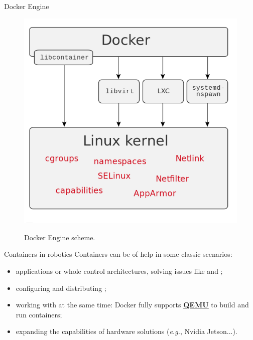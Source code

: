 \begin{frame}{Docker Engine}
	\begin{figure}
		\centering
		\includegraphics[scale=.29]{dockerScheme.png}
		\label{fig:dockerscheme}
		\caption{Docker Engine scheme.}
	\end{figure}
\end{frame}

\begin{frame}{Containers in robotics}
	Containers can be of help in some classic scenarios:
	\begin{itemize}
		\item {} applications or whole control architectures, solving issues like  and ;
		\item configuring and distributing ;
		\item working with  at the same time: Docker fully supports \href{https://www.qemu.org/}{\color{blue}\textbf{\underline{QEMU}}} to build and run containers;
		\item expanding the capabilities of  hardware solutions (\emph{e.g.}, Nvidia Jetson...).
	\end{itemize}
\end{frame}

